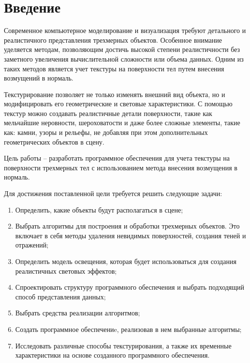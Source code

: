 	\chapter*{Введение}

Современное компьютерное моделирование и визуализация требуют детального и реалистичного представления трехмерных объектов. Особенное внимание уделяется методам, позволяющим достичь высокой степени реалистичности без заметного увеличения вычислительной сложности или объема данных. Одним из таких методов является учет текстуры на поверхности тел путем внесения возмущений в нормаль.

Текстурирование позволяет не только изменять внешний вид объекта, но и модифицировать его геометрические и световые характеристики. С помощью текстур можно создавать реалистичные детали поверхности, такие как мельчайшие неровности, шероховатости и даже более сложные элементы, такие как: камни, узоры и рельефы, не добавляя при этом дополнительных геометрических объектов в сцену.

Цель работы – разработать программное обеспечения для учета текстуры на поверхности трехмерных тел с использованием метода внесения возмущения в нормаль.

Для достижения поставленной цели требуется решить следующие задачи:
\begin{enumerate}[label=\arabic*)]
    \item Определить, какие объекты будут располагаться в сцене;
    \item Выбрать алгоритмы для построения и обработки трехмерных объектов. Это включает в себя методы удаления невидимых поверхностей, создания теней и отражений;
    \item Определить модель освещения, которая будет использоваться для создания реалистичных световых эффектов;
    \item Спроектировать структуру программного обеспечения и выбрать подходящий способ представления данных;
    \item Выбрать средства реализации алгоритмов;
    \item Создать программное обеспечениe, реализовав в нем выбранные алгоритмы;
    \item Исследовать различные способы текстурирования, а также их временные характеристики на основе созданного программного обеспечения.
\end{enumerate}
